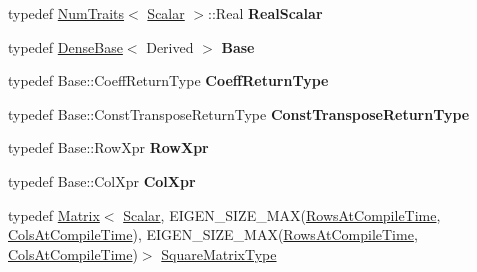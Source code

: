 \begin{DoxyCompactItemize}
\item 
\mbox{\label{class_eigen_1_1_matrix_base_a6dbfafdc24900b9266dfeb1590f834c6}} 
typedef \mbox{\hyperlink{struct_eigen_1_1_num_traits}{Num\+Traits}}$<$ \mbox{\hyperlink{class_eigen_1_1_dense_base_a5feed465b3a8e60c47e73ecce83e39a2}{Scalar}} $>$\+::Real {\bfseries Real\+Scalar}
\item 
\mbox{\label{class_eigen_1_1_matrix_base_a1aa6d87d1fd832d377e5b6960b33b68c}} 
typedef \mbox{\hyperlink{class_eigen_1_1_dense_base}{Dense\+Base}}$<$ Derived $>$ {\bfseries Base}
\item 
\mbox{\label{class_eigen_1_1_matrix_base_aaef25f2e4018090fe6d9255cb78d0f1a}} 
typedef Base\+::\+Coeff\+Return\+Type {\bfseries Coeff\+Return\+Type}
\item 
\mbox{\label{class_eigen_1_1_matrix_base_a885b1a5b28e9f6857c70ce1bacafc800}} 
typedef Base\+::\+Const\+Transpose\+Return\+Type {\bfseries Const\+Transpose\+Return\+Type}
\item 
\mbox{\label{class_eigen_1_1_matrix_base_abd6c865af90538ea3bb8ed28613bf6c7}} 
typedef Base\+::\+Row\+Xpr {\bfseries Row\+Xpr}
\item 
\mbox{\label{class_eigen_1_1_matrix_base_ae329159460bfea1d939b59f3590e869d}} 
typedef Base\+::\+Col\+Xpr {\bfseries Col\+Xpr}
\item 
typedef \mbox{\hyperlink{class_eigen_1_1_matrix}{Matrix}}$<$ \mbox{\hyperlink{class_eigen_1_1_dense_base_a5feed465b3a8e60c47e73ecce83e39a2}{Scalar}}, E\+I\+G\+E\+N\+\_\+\+S\+I\+Z\+E\+\_\+\+M\+AX(\mbox{\hyperlink{class_eigen_1_1_dense_base_a86241c772c74c04eeeb0480b99c5ab77adb37c78ebbf15aa20b65c3b70415a1ab}{Rows\+At\+Compile\+Time}}, \mbox{\hyperlink{class_eigen_1_1_dense_base_a86241c772c74c04eeeb0480b99c5ab77a787f85fd67ee5985917eb2cef6e70441}{Cols\+At\+Compile\+Time}}), E\+I\+G\+E\+N\+\_\+\+S\+I\+Z\+E\+\_\+\+M\+AX(\mbox{\hyperlink{class_eigen_1_1_dense_base_a86241c772c74c04eeeb0480b99c5ab77adb37c78ebbf15aa20b65c3b70415a1ab}{Rows\+At\+Compile\+Time}}, \mbox{\hyperlink{class_eigen_1_1_dense_base_a86241c772c74c04eeeb0480b99c5ab77a787f85fd67ee5985917eb2cef6e70441}{Cols\+At\+Compile\+Time}})$>$ \mbox{\hyperlink{class_eigen_1_1_matrix_base_a3cf75a9110a1a28c493e124c8a7fcade}{Square\+Matrix\+Type}}

\end{DoxyCompactItemize}
